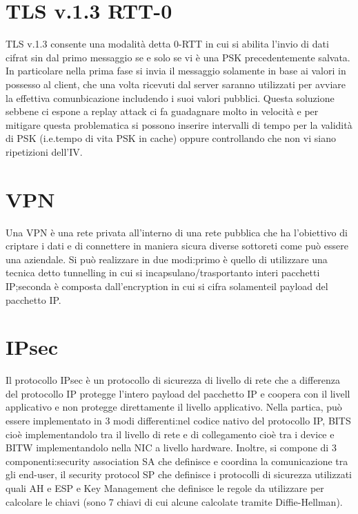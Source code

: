\documentclass{article}
\begin{document}
\section{TLS v.1.3 RTT-0}
TLS v.1.3 consente una modalità detta 0-RTT in cui si abilita l'invio di dati cifrat sin dal primo messaggio se e solo se vi è una PSK precedentemente salvata\@. In particolare nella prima fase si invia il messaggio solamente in base ai valori in possesso al client, che una volta ricevuti dal server saranno utilizzati per avviare la effettiva comunbicazione includendo i suoi valori pubblici\@. Questa soluzione sebbene ci espone a replay attack ci fa guadagnare molto in velocità e per mitigare questa problematica si possono inserire intervalli di tempo per la validità di PSK (i.e.tempo di vita PSK in cache) oppure controllando che non vi siano ripetizioni dell'IV\@.
\section{VPN}
Una VPN è una rete privata all'interno di una rete pubblica che ha l'obiettivo di criptare i dati e di connettere in maniera sicura diverse sottoreti come può essere una aziendale\@. Si può realizzare in due modi:\@il primo è quello di utilizzare una tecnica detto tunnelling in cui si incapsulano/trasportanto interi pacchetti IP;\@la seconda è composta dall'encryption in cui si cifra solamenteil payload del pacchetto IP\@.
\section{IPsec}
Il protocollo IPsec è un protocollo di sicurezza di livello di rete che a differenza del protocollo IP protegge l'intero payload del pacchetto IP e coopera con il livell applicativo e non protegge direttamente il livello applicativo\@. Nella partica, può essere implementato in 3 modi differenti:\@inserendo nel codice nativo del protocollo IP, BITS cioè implementandolo tra il livello di rete e di collegamento cioè tra i device e BITW implementandolo nella NIC a livello hardware\@.\newline
Inoltre, si compone di 3 componenti:\@la security association SA che definisce e coordina la comunicazione tra gli end-user, il security protocol SP che definisce i protocolli di sicurezza utilizzati quali AH e ESP e Key Management che definisce le regole da utilizzare per calcolare le chiavi (sono 7 chiavi di cui alcune calcolate tramite Diffie-Hellman)\@.
\end{document}
